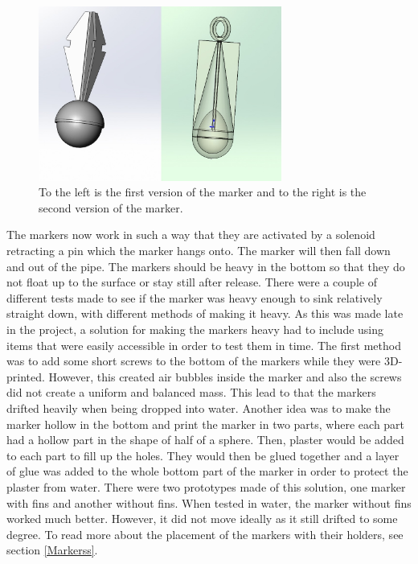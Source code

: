 \begin{figure}[!ht]
	\begin{center}
		\includegraphics[width=80mm]{./Images/Mechanics/FirstAndSecondMarker.jpg}
		\caption{To the left is the first version of the marker and to the right is the second version of the marker.}
		\label{MarkerPics}
	\end{center}
\end{figure}

The markers now work in such a way that they are activated by a solenoid retracting a pin which the marker hangs onto. The marker will then fall down and out of the pipe. The markers should be heavy in the bottom so that they do not float up to the surface or stay still after release. There were a couple of different tests made to see if the marker was heavy enough to sink relatively straight down, with different methods of making it heavy. As this was made late in the project, a solution for making the markers heavy had to include using items that were easily accessible in order to test them in time. The first method was to add some short screws to the bottom of the markers while they were 3D-printed. However, this created air bubbles inside the marker and also the screws did not create a uniform and balanced mass. This lead to that the markers drifted heavily when being dropped into water. Another idea was to make the marker hollow in the bottom and print the marker in two parts, where each part had a hollow part in the shape of half of a sphere. Then, plaster would be added to each part to fill up the holes. They would then be glued together and a layer of glue was added to the whole bottom part of the marker in order to protect the plaster from water. There were two prototypes made of this solution, one marker with fins and another without fins. When tested in water, the marker without fins worked much better. However, it did not move ideally as it still drifted to some degree. To read more about the placement of the markers with their holders, see section \ref{Markerss}. 


